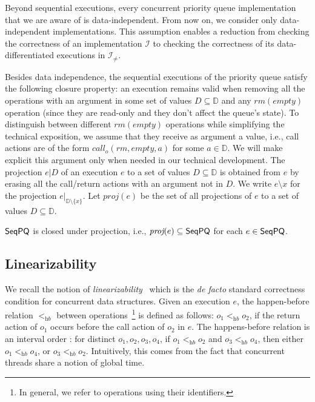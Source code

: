 \documentclass[a4paper,UKenglish]{lipics-v2016}
\begin{document}
Beyond sequential executions, every concurrent priority queue implementation that we are aware of is data-independent. From now on, we consider only data-independent implementations. This assumption enables a reduction from checking the correctness of an implementation $\mathcal{I}$ to checking the correctness of its data-differentiated executions in $\mathcal{I}_{\neq}$.

Besides data independence, the sequential executions of the priority queue satisfy the following closure property: an execution remains valid when removing all the operations with an argument in some set of values $D \subseteq \mathbb{D}$ and any $\textit{rm}(\textit{empty})$ operation (since they are read-only and they don't affect the queue's state).
To distinguish between different $\textit{rm}(\textit{empty})$ operations while simplifying the technical exposition, we assume that they receive as argument a value, i.e., call actions are of the form $\textit{call}_o(\textit{rm},\textit{empty},a)$ for some $a\in \mathbb{D}$. We will make explicit this argument only when needed in our technical development. The projection $e \vert D$ of an execution $e$ to a set of values $D \subseteq \mathbb{D}$ is obtained from $e$ by erasing all the call/return actions with an argument not in $D$. We write $e \setminus x$ for the projection $e \vert_{ \mathbb{D} \setminus \{ x \} }$. Let $\textit{proj}(e)$ be the set of all projections of $e$ to a set of values $D \subseteq \mathbb{D}$. 


\begin{lemma}
\label{lem:closure_proj}
$\mathsf{SeqPQ}$ is closed under projection, i.e., $\textit{proj}(e)\subseteq \mathsf{SeqPQ}$ for each $e\in \mathsf{SeqPQ}$.
\end{lemma}


\subsection{Linearizability}\label{ssec:lin}

We recall the notion of \emph{linearizability}~\cite{journals/toplas/HerlihyW90} which is the \emph{de facto} standard correctness condition for concurrent data structures.
Given an execution $e$, the happen-before relation $<_{\textit{hb}}$ between operations~\footnote{In general, we refer to operations using their identifiers.} is defined as follows: $o_1 <_{\textit{hb}} o_2$, if the return action of $o_1$ occurs before the call action of $o_2$ in $e$. The happens-before relation is an interval order \cite{DBLP:conf/popl/BouajjaniEEH15}: for distinct $o_1,o_2,o_3,o_4$, if $o_1 <_{\textit{hb}} o_2$ and $o_3 <_{\textit{hb}} o_4$, then either $o_1 <_{\textit{hb}} o_4$, or $o_3 <_{\textit{hb}} o_2$. Intuitively, this comes from the fact that concurrent threads share a notion of global time.
\end{document}
